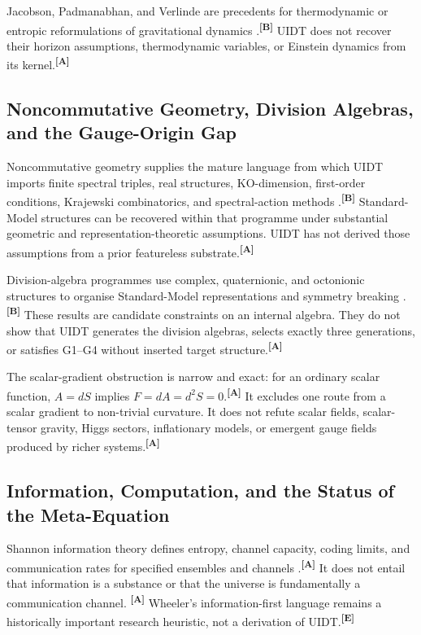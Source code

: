 \documentclass[12pt,a4paper,twoside]{article}
\theoremstyle{plain}
\theoremstyle{definition}
\theoremstyle{remark}
\newcommand{\catmark}[1]{\textsuperscript{\textsf{\textbf{[#1]}}}}
\begin{document}
Jacobson, Padmanabhan, and Verlinde are precedents for thermodynamic or entropic
reformulations of gravitational dynamics
\cite{jacobson1995,padmanabhan2010,verlinde2011}.\catmark{B} UIDT does not
recover their horizon assumptions, thermodynamic variables, or Einstein
dynamics from its kernel.\catmark{A}

\subsection{Noncommutative Geometry, Division Algebras, and the Gauge-Origin Gap}
\label{subsec:ctx-gauge-origin}

Noncommutative geometry supplies the mature language from which UIDT imports
finite spectral triples, real structures, KO-dimension, first-order
conditions, Krajewski combinatorics, and spectral-action methods
\cite{connes2006,cc2008,vansuijlekom2019}.\catmark{B} Standard-Model
structures can be recovered within that programme under substantial geometric
and representation-theoretic assumptions. UIDT has not derived those
assumptions from a prior featureless substrate.\catmark{A}

Division-algebra programmes use complex, quaternionic, and octonionic
structures to organise Standard-Model representations and symmetry breaking
\cite{furey2018,todorov2022,fureyhughes2022,gourlay2024}.\catmark{B} These
results are candidate constraints on an internal algebra. They do not show that
UIDT generates the division algebras, selects exactly three generations, or
satisfies G1--G4 without inserted target structure.\catmark{A}

The scalar-gradient obstruction is narrow and exact: for an ordinary scalar
function, $A=dS$ implies $F=dA=d^2S=0$.\catmark{A} It excludes one route from
a scalar gradient to non-trivial curvature. It does not refute scalar fields,
scalar-tensor gravity, Higgs sectors, inflationary models, or emergent gauge
fields produced by richer systems.\catmark{A}

\subsection{Information, Computation, and the Status of the Meta-Equation}
\label{subsec:ctx-information-computation}

Shannon information theory defines entropy, channel capacity, coding limits,
and communication rates for specified ensembles and channels
\cite{shannon1948}.\catmark{A} It does not entail that information is a
substance or that the universe is fundamentally a communication channel.
\catmark{A} Wheeler's information-first language remains a historically
important research heuristic, not a derivation of UIDT.\catmark{E}
\end{document}
